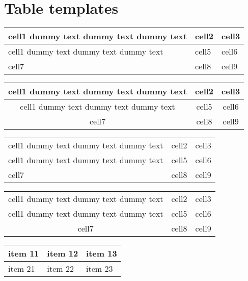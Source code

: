 \chapter{Table templates}
\label{tables}


\begin{tabular}{ | m{5em} | m{1cm}| m{1cm} | } 
    \hline
    cell1 dummy text dummy text dummy text& cell2 & cell3 \\ 
    \hline
    cell1 dummy text dummy text dummy text & cell5 & cell6 \\ 
    \hline
    cell7 & cell8 & cell9 \\ 
    \hline
\end{tabular}

\begin{tabular}{ |c|c|c| } 
    \hline
    cell1 dummy text dummy text dummy text& cell2 & cell3 \\ 
    \hline
    cell1 dummy text dummy text dummy text & cell5 & cell6 \\ 
    \hline
    cell7 & cell8 & cell9 \\ 
    \hline
\end{tabular}


\begin{tabular}{ | m{5em} | m{1cm}| m{1cm} | } 
    \hline
    cell1 dummy text dummy text dummy text& cell2 & cell3 \\ 
    \Xhline{1.5pt}
    cell1 dummy text dummy text dummy text & cell5 & cell6 \\ 
    \hline
    cell7 & cell8 & cell9 \\ 
    \hline
\end{tabular}

\begin{tabular}{ |c|c|c| } 
    \hline
    cell1 dummy text dummy text dummy text& cell2 & cell3 \\ 
    \Xhline{1.5pt}
    cell1 dummy text dummy text dummy text & cell5 & cell6 \\ 
    \hline
    cell7 & cell8 & cell9 \\ 
    \hline
\end{tabular}

\begin{tabularx}{0.8\textwidth} { 
  | >{\raggedright\arraybackslash}X 
  | >{\centering\arraybackslash}X 
  | >{\raggedleft\arraybackslash}X | }
 \hline
 item 11 & item 12 & item 13 \\
 \hline
 item 21  & item 22  & item 23  \\
\hline
\end{tabularx}
